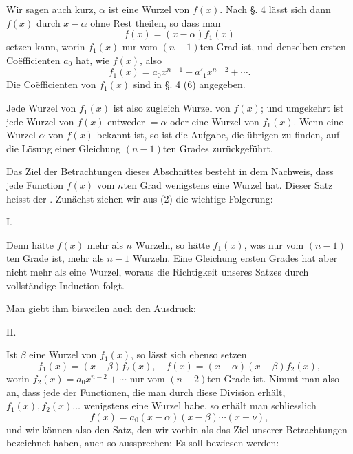 
Wir sagen auch kurz, $\alpha$ ist eine Wurzel von $f(x)$. Nach §. 4 lässt sich dann $f(x)$ durch $x-\alpha$ ohne Rest theilen, so dass man
\begin{equation}
 f(x)=(x-\alpha)f_1(x)
\tag{2}
\end{equation}
setzen kann, worin $f_1(x)$ nur vom $(n-1)$ten Grad ist, und denselben ersten Coëfficienten $a_0$ hat, wie $f(x)$, also
\[
 f_1(x)=a_0x^{n-1}+a'_1x^{n-2}+\cdots .
\]
Die Coëfficienten von $f_1(x)$ sind in §. 4 (6) angegeben.

Jede Wurzel von $f_1(x)$ ist also zugleich Wurzel von $f(x)$; und umgekehrt ist jede Wurzel von $f(x)$ entweder $=\alpha$ oder eine Wurzel von $f_1(x)$. Wenn eine Wurzel $\alpha$ von $f(x)$ bekannt ist, so ist die Aufgabe, die übrigen zu finden, auf die Lösung einer Gleichung $(n-1)$ten Grades zurückgeführt.

Das Ziel der Betrachtungen dieses Abschnittes besteht in dem Nachweis, dass jede Function $f(x)$ vom $n$ten Grad wenigstens eine Wurzel hat. Dieser Satz heisst der . Zunächst ziehen wir aus (2) die wichtige Folgerung:

\medskip
\noindent I. 
\medskip

Denn hätte $f(x)$ mehr als $n$ Wurzeln, so hätte $f_1(x)$, was nur vom $(n-1)$ten Grade ist, mehr als $n-1$ Wurzeln. Eine Gleichung ersten Grades hat aber nicht mehr als eine Wurzel, woraus die Richtigkeit unseres Satzes durch vollständige Induction folgt.

Man giebt ihm bisweilen auch den Ausdruck:

\medskip
\noindent II. 
\medskip

Ist $\beta$ eine Wurzel von $f_1(x)$, so lässt sich ebenso setzen
\[
 f_1(x)=(x-\beta)f_2(x),\quad f(x)=(x-\alpha)(x-\beta)f_2(x),
\]
worin $f_2(x)=a_0x^{n-2}+\cdots$ nur vom $(n-2)$ten Grade ist. Nimmt man also an, dass jede der Functionen, die man durch diese Division erhält, $f_1(x), f_2(x)\ldots$ wenigstens eine Wurzel habe, so erhält man schliesslich
\begin{equation}
 f(x)=a_0(x-\alpha)(x-\beta)\cdots(x-\nu),
\tag{3}
\end{equation}
und wir können also den Satz, den wir vorhin als das Ziel unserer Betrachtungen bezeichnet haben, auch so aussprechen: Es soll bewiesen werden:

\medskip
